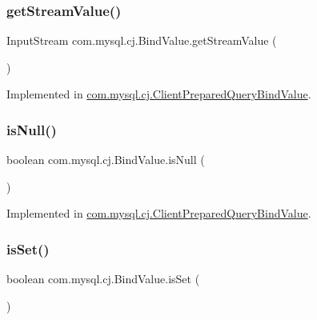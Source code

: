 \subsubsection{\texorpdfstring{get\+Stream\+Value()}{getStreamValue()}}
{\footnotesize\ttfamily Input\+Stream com.\+mysql.\+cj.\+Bind\+Value.\+get\+Stream\+Value (\begin{DoxyParamCaption}{ }\end{DoxyParamCaption})}



Implemented in \mbox{\hyperlink{classcom_1_1mysql_1_1cj_1_1_client_prepared_query_bind_value_a57dcbdd8ef4f98c2142bf6c6ee217035}{com.\+mysql.\+cj.\+Client\+Prepared\+Query\+Bind\+Value}}.

\mbox{\label{interfacecom_1_1mysql_1_1cj_1_1_bind_value_af0ec3dd14fdf2d01af7e7195ef43369a}} 
\subsubsection{\texorpdfstring{is\+Null()}{isNull()}}
{\footnotesize\ttfamily boolean com.\+mysql.\+cj.\+Bind\+Value.\+is\+Null (\begin{DoxyParamCaption}{ }\end{DoxyParamCaption})}



Implemented in \mbox{\hyperlink{classcom_1_1mysql_1_1cj_1_1_client_prepared_query_bind_value_ae4e7ad98b2e3a345ed4313d999e4d3a5}{com.\+mysql.\+cj.\+Client\+Prepared\+Query\+Bind\+Value}}.

\mbox{\label{interfacecom_1_1mysql_1_1cj_1_1_bind_value_a559abc1794dd2783db255ab3b341fa70}} 
\subsubsection{\texorpdfstring{is\+Set()}{isSet()}}
{\footnotesize\ttfamily boolean com.\+mysql.\+cj.\+Bind\+Value.\+is\+Set (\begin{DoxyParamCaption}{ }\end{DoxyParamCaption})}



